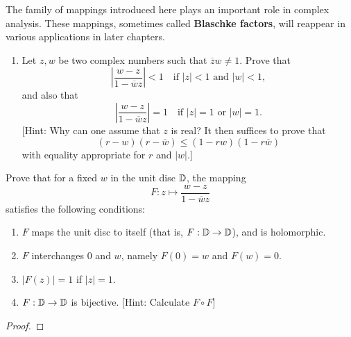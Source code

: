 \documentclass[../hw1]{subfiles}
\begin{document}
\begin{problem}
The family of mappings introduced here plays an important role in complex
analysis.
These mappings, sometimes called \textbf{Blaschke factors}, will reappear in
various applications in later chapters.
\begin{enumerate}[label = (\alph*)]
	\item Let $z,w$ be two complex numbers such that  $\overline{z} w \neq 1$.
	      Prove that \[
		      \left| \frac{w-z}{1-\overline{w}z} \right| <1\quad \text{if } |z|<1 \text{ and } |w| < 1
		      ,\] and also that \[
		      \left| \frac{w-z}{1-\overline{w}z} \right| =1\quad \text{if } |z|=1 \text{ or } |w| = 1
		      .\]
	      [Hint: Why can one assume that $z$ is real?
	      It then suffices to prove that  \[
		      (r-w)(r-\overline{w})\le (1-rw)(1-r\overline{w})
	      \] with equality appropriate for $r$ and  $|w|$.]
\end{enumerate}
\item Prove that for a fixed $w$ in the unit disc  $\mathbb{D}$, the mapping \[
	F: z \mapsto \frac{w-z}{1-\overline{w}z}
\] satisfies the following conditions:
\begin{enumerate}[label = (\roman*)]
	\item $F$ maps the unit disc to itself (that is, $F:\mathbb{D} \to \mathbb{D}$), and is holomorphic.
	\item $F$ interchanges 0 and $w$, namely $F(0)=w$ and $F(w)=0$.
	\item $|F(z)| = 1$ if $|z| = 1$.
	\item $F:\mathbb{D} \to \mathbb{D}$ is bijective.
		      [Hint: Calculate $F \circ F$]
\end{enumerate}
\end{problem}
\begin{proof}

\end{proof}
\end{document}
